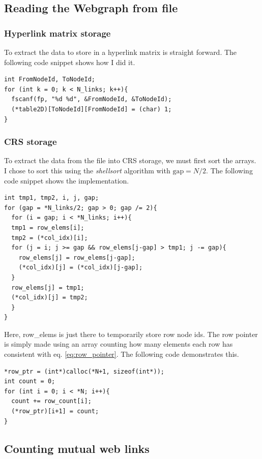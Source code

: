 \documentclass[english,notitlepage, reprint]{revtex4-1}  %
\begin{document}
\subsection*{Reading the Webgraph from file}
\subsubsection{Hyperlink matrix storage}
To extract the data to store in a hyperlink matrix is straight forward. The following code snippet shows how I did it.
\begin{lstlisting}[style=customc]
int FromNodeId, ToNodeId;
for (int k = 0; k < N_links; k++){
  fscanf(fp, "%d %d", &FromNodeId, &ToNodeId);
  (*table2D)[ToNodeId][FromNodeId] = (char) 1;
}
\end{lstlisting}

\subsubsection{CRS storage}
To extract the data from the file into CRS storage, we must first sort the arrays. I chose to sort this using the \textit{shellsort} algorithm with $\text{gap} = N/2$. The following code snippet shows the implementation.

\begin{lstlisting}[style=customc]
int tmp1, tmp2, i, j, gap;
for (gap = *N_links/2; gap > 0; gap /= 2){
  for (i = gap; i < *N_links; i++){
  tmp1 = row_elems[i];
  tmp2 = (*col_idx)[i];
  for (j = i; j >= gap && row_elems[j-gap] > tmp1; j -= gap){
    row_elems[j] = row_elems[j-gap];
    (*col_idx)[j] = (*col_idx)[j-gap];
  }
  row_elems[j] = tmp1;
  (*col_idx)[j] = tmp2;
  }
}
\end{lstlisting}
Here, row\_elems is just there to temporarily store row node ids. The row pointer is simply made using an array counting how many elements each row has consistent with eq. \eqref{eq:row_pointer}. The following code demonstrates this.
\begin{lstlisting}[style=customc]
*row_ptr = (int*)calloc(*N+1, sizeof(int*));
int count = 0;
for (int i = 0; i < *N; i++){
  count += row_count[i];
  (*row_ptr)[i+1] = count;
}
\end{lstlisting}

\subsection*{Counting mutual web links}
\end{document}

